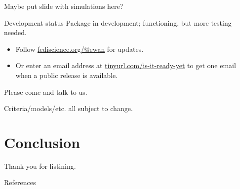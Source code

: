 \documentclass[11pt]{beamer}
\begin{document}
\begin{frame}[t]{Maybe put slide with simulations here?}

\end{frame}

\begin{frame}[t]{Development status}
	Package in development; functioning, but more testing needed.

	\begin{itemize}
		\item Follow
		      \href{https://fediscience.org/@ewan}{\textcolor{KCLseablue}{fediscience.org/@ewan}}
		      for updates.
		\item Or enter an email address at
		      \href{https://tinyurl.com/pmsims-announce}{\textcolor{KCLseablue}{tinyurl.com/is-it-ready-yet}}
		      to get one email when a public release is available.
	\end{itemize}

    Please come and talk to us.

    Criteria/models/etc. all subject to change.

\end{frame}



\section{Conclusion}

\begin{frame}
    Thank you for listining.
\end{frame}

\appendix

\begin{frame}[allowframebreaks]{References}
    \printbibliography
\end{frame}
\end{document}
